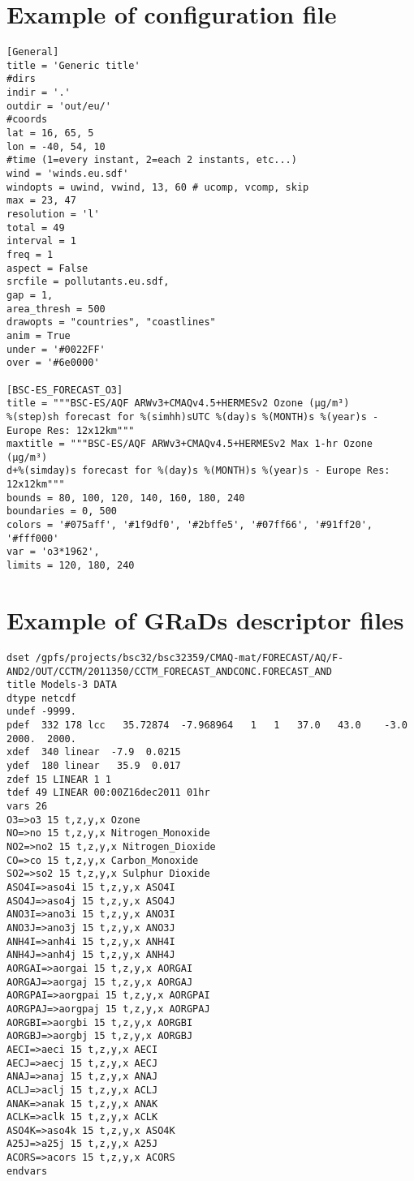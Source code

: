 \documentclass[11pt]{article}
\newcommand{\grads}{GRaDs}
\begin{document}
\section{Example of configuration file}
\label{app:conf-file}
\begin{verbatim}
[General]
title = 'Generic title'
#dirs
indir = '.'
outdir = 'out/eu/' 
#coords
lat = 16, 65, 5
lon = -40, 54, 10
#time (1=every instant, 2=each 2 instants, etc...)
wind = 'winds.eu.sdf'
windopts = uwind, vwind, 13, 60 # ucomp, vcomp, skip
max = 23, 47
resolution = 'l'
total = 49
interval = 1
freq = 1
aspect = False
srcfile = pollutants.eu.sdf, 
gap = 1, 
area_thresh = 500
drawopts = "countries", "coastlines"
anim = True
under = '#0022FF'
over = '#6e0000' 

[BSC-ES_FORECAST_O3]
title = """BSC-ES/AQF ARWv3+CMAQv4.5+HERMESv2 Ozone (µg/m³)
%(step)sh forecast for %(simhh)sUTC %(day)s %(MONTH)s %(year)s - Europe Res: 12x12km"""
maxtitle = """BSC-ES/AQF ARWv3+CMAQv4.5+HERMESv2 Max 1-hr Ozone (µg/m³)
d+%(simday)s forecast for %(day)s %(MONTH)s %(year)s - Europe Res: 12x12km"""
bounds = 80, 100, 120, 140, 160, 180, 240 
boundaries = 0, 500
colors = '#075aff', '#1f9df0', '#2bffe5', '#07ff66', '#91ff20', '#fff000'
var = 'o3*1962',
limits = 120, 180, 240
\end{verbatim}


\section{Example of \grads{} descriptor files}
\label{sec:grads-descriptor}
\begin{verbatim}
dset /gpfs/projects/bsc32/bsc32359/CMAQ-mat/FORECAST/AQ/F-AND2/OUT/CCTM/2011350/CCTM_FORECAST_ANDCONC.FORECAST_AND
title Models-3 DATA
dtype netcdf
undef -9999.
pdef  332 178 lcc   35.72874  -7.968964   1   1   37.0   43.0    -3.0  2000.  2000.
xdef  340 linear  -7.9  0.0215
ydef  180 linear   35.9  0.017
zdef 15 LINEAR 1 1
tdef 49 LINEAR 00:00Z16dec2011 01hr
vars 26
O3=>o3 15 t,z,y,x Ozone
NO=>no 15 t,z,y,x Nitrogen_Monoxide
NO2=>no2 15 t,z,y,x Nitrogen_Dioxide
CO=>co 15 t,z,y,x Carbon_Monoxide
SO2=>so2 15 t,z,y,x Sulphur Dioxide
ASO4I=>aso4i 15 t,z,y,x ASO4I
ASO4J=>aso4j 15 t,z,y,x ASO4J
ANO3I=>ano3i 15 t,z,y,x ANO3I
ANO3J=>ano3j 15 t,z,y,x ANO3J
ANH4I=>anh4i 15 t,z,y,x ANH4I
ANH4J=>anh4j 15 t,z,y,x ANH4J
AORGAI=>aorgai 15 t,z,y,x AORGAI
AORGAJ=>aorgaj 15 t,z,y,x AORGAJ
AORGPAI=>aorgpai 15 t,z,y,x AORGPAI
AORGPAJ=>aorgpaj 15 t,z,y,x AORGPAJ
AORGBI=>aorgbi 15 t,z,y,x AORGBI
AORGBJ=>aorgbj 15 t,z,y,x AORGBJ
AECI=>aeci 15 t,z,y,x AECI
AECJ=>aecj 15 t,z,y,x AECJ
ANAJ=>anaj 15 t,z,y,x ANAJ
ACLJ=>aclj 15 t,z,y,x ACLJ
ANAK=>anak 15 t,z,y,x ANAK
ACLK=>aclk 15 t,z,y,x ACLK
ASO4K=>aso4k 15 t,z,y,x ASO4K
A25J=>a25j 15 t,z,y,x A25J
ACORS=>acors 15 t,z,y,x ACORS
endvars
\end{verbatim}
\end{document}
